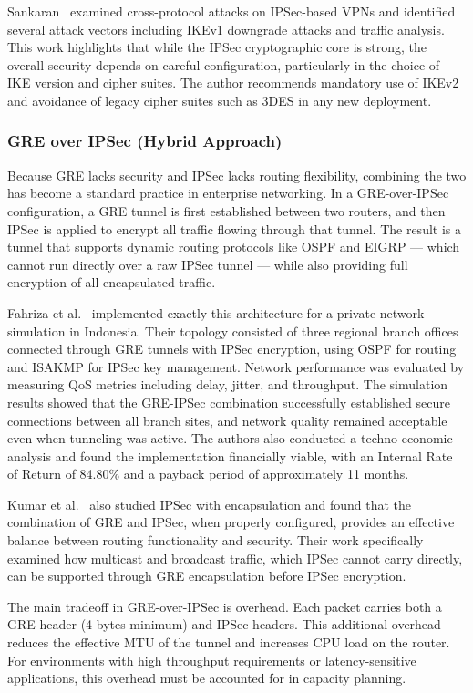 \documentclass[conference]{IEEEtran}
\begin{document}
Sankaran~\cite{sankaran2023} examined cross-protocol attacks on
IPSec-based VPNs and identified several attack vectors including
IKEv1 downgrade attacks and traffic analysis. This work highlights
that while the IPSec cryptographic core is strong, the overall
security depends on careful configuration, particularly in the
choice of IKE version and cipher suites. The author recommends
mandatory use of IKEv2 and avoidance of legacy cipher suites such
as 3DES in any new deployment.

\subsubsection{GRE over IPSec (Hybrid Approach)}

Because GRE lacks security and IPSec lacks routing flexibility,
combining the two has become a standard practice in enterprise
networking. In a GRE-over-IPSec configuration, a GRE tunnel is
first established between two routers, and then IPSec is applied
to encrypt all traffic flowing through that tunnel. The result is
a tunnel that supports dynamic routing protocols like OSPF and
EIGRP --- which cannot run directly over a raw IPSec tunnel ---
while also providing full encryption of all encapsulated traffic.

Fahriza et al.~\cite{fahriza2026} implemented exactly this
architecture for a private network simulation in Indonesia. Their
topology consisted of three regional branch offices connected
through GRE tunnels with IPSec encryption, using OSPF for routing
and ISAKMP for IPSec key management. Network performance was
evaluated by measuring QoS metrics including delay, jitter, and
throughput. The simulation results showed that the GRE-IPSec
combination successfully established secure connections between
all branch sites, and network quality remained acceptable even
when tunneling was active. The authors also conducted a
techno-economic analysis and found the implementation financially
viable, with an Internal Rate of Return of 84.80\% and a payback
period of approximately 11 months.

Kumar et al.~\cite{kumar2020} also studied IPSec with encapsulation
and found that the combination of GRE and IPSec, when properly
configured, provides an effective balance between routing
functionality and security. Their work specifically examined how
multicast and broadcast traffic, which IPSec cannot carry
directly, can be supported through GRE encapsulation before
IPSec encryption.

The main tradeoff in GRE-over-IPSec is overhead. Each packet
carries both a GRE header (4 bytes minimum) and IPSec headers.
This additional overhead reduces the effective MTU of the tunnel
and increases CPU load on the router. For environments with high
throughput requirements or latency-sensitive applications, this
overhead must be accounted for in capacity planning.
\end{document}
